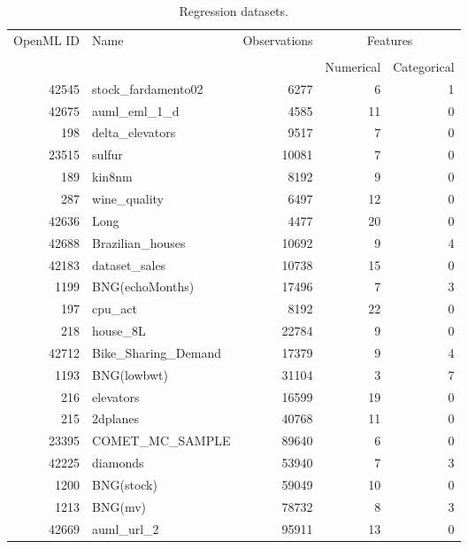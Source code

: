\begin{table}[h!]
\centering
\begin{tabular}{rlrrr}
\toprule
\multirow{2}{*}{OpenML ID} & \multirow{2}{*}{Name} & \multirow{2}{*}{Observations} & \multicolumn{2}{c}{Features} \\ \cline{4-5}
\\[-0.75em]
&                       &                            & Numerical    & Categorical   \\
\midrule
     42545 &  stock\_fardamento02 &         6277 &                6 &                1 \\
     42675 &        auml\_eml\_1\_d &         4585 &               11 &                0 \\
       198 &     delta\_elevators &         9517 &                7 &                0 \\
     23515 &              sulfur &        10081 &                7 &                0 \\
       189 &              kin8nm &         8192 &                9 &                0 \\
       287 &        wine\_quality &         6497 &               12 &                0 \\
     42636 &                Long &         4477 &               20 &                0 \\
     42688 &    Brazilian\_houses &        10692 &                9 &                4 \\
     42183 &       dataset\_sales &        10738 &               15 &                0 \\
      1199 &     BNG(echoMonths) &        17496 &                7 &                3 \\
       197 &             cpu\_act &         8192 &               22 &                0 \\
       218 &            house\_8L &        22784 &                9 &                0 \\
     42712 & Bike\_Sharing\_Demand &        17379 &                9 &                4 \\
      1193 &         BNG(lowbwt) &        31104 &                3 &                7 \\
       216 &           elevators &        16599 &               19 &                0 \\
       215 &            2dplanes &        40768 &               11 &                0 \\
     23395 &     COMET\_MC\_SAMPLE &        89640 &                6 &                0 \\
     42225 &            diamonds &        53940 &                7 &                3 \\
      1200 &          BNG(stock) &        59049 &               10 &                0 \\
      1213 &             BNG(mv) &        78732 &                8 &                3 \\
     42669 &          auml\_url\_2 &        95911 &               13 &                0 \\
\bottomrule
\end{tabular}
\caption{Regression datasets.}
\label{tab:regression_data}
\end{table}
